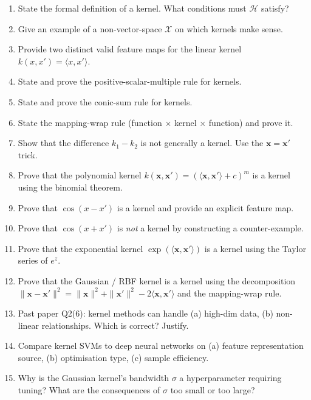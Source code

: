 \documentclass[11pt, a4paper]{article}
\begin{document}
\begin{enumerate}
  \item State the formal definition of a kernel. What conditions must $\mathcal{H}$ satisfy?
  \item Give an example of a non-vector-space $\mathcal{X}$ on which kernels make sense.
  \item Provide two distinct valid feature maps for the linear kernel $k(x, x') = \langle x, x'\rangle$.
  \item State and prove the positive-scalar-multiple rule for kernels.
  \item State and prove the conic-sum rule for kernels.
  \item State the mapping-wrap rule (function $\times$ kernel $\times$ function) and prove it.
  \item Show that the difference $k_1 - k_2$ is not generally a kernel. Use the $\mathbf{x} = \mathbf{x}'$ trick.
  \item Prove that the polynomial kernel $k(\mathbf{x}, \mathbf{x}') = (\langle\mathbf{x}, \mathbf{x}'\rangle + c)^m$ is a kernel using the binomial theorem.
  \item Prove that $\cos(x - x')$ is a kernel and provide an explicit feature map.
  \item Prove that $\cos(x + x')$ is \emph{not} a kernel by constructing a counter-example.
  \item Prove that the exponential kernel $\exp(\langle\mathbf{x}, \mathbf{x}'\rangle)$ is a kernel using the Taylor series of $e^z$.
  \item Prove that the Gaussian / RBF kernel is a kernel using the decomposition $\|\mathbf{x}-\mathbf{x}'\|^2 = \|\mathbf{x}\|^2 + \|\mathbf{x}'\|^2 - 2\langle\mathbf{x}, \mathbf{x}'\rangle$ and the mapping-wrap rule.
  \item Past paper Q2(6): kernel methods can handle (a) high-dim data, (b) non-linear relationships. Which is correct? Justify.
  \item Compare kernel SVMs to deep neural networks on (a) feature representation source, (b) optimisation type, (c) sample efficiency.
  \item Why is the Gaussian kernel's bandwidth $\sigma$ a hyperparameter requiring tuning? What are the consequences of $\sigma$ too small or too large?
\end{enumerate}
\end{document}
